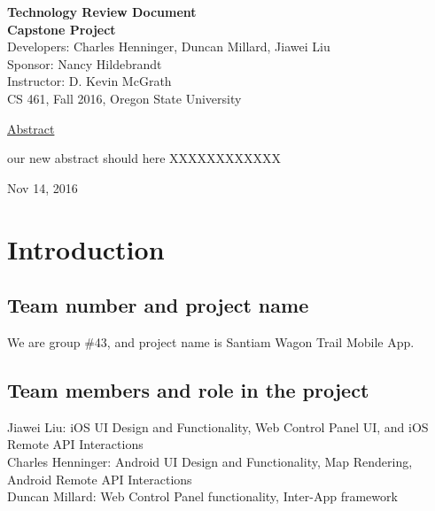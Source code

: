 \documentclass[letterpaper, 10pt,titlepage]{article}
\newcommand\tab[1][1cm]{\hspace*{#1}}
\begin{document}
\begin{titlepage}
\begin{center}
    \Huge
    \textbf{Technology Review Document}\\
    \textbf{Capstone Project}\\
    \vspace{1.0cm}
    \large
    Developers: Charles Henninger, Duncan Millard, Jiawei Liu\\
    Sponsor: Nancy Hildebrandt\\
    \vspace{1.5cm}
    \large
    Instructor: D. Kevin McGrath\\

    \large
    CS 461, Fall 2016, Oregon State University\\    

    \vspace{3.2cm}

    \large
    \underline{Abstract}\\
    \vspace{0.3cm}
    \end{center}
    \large

    \tab our new abstract should here XXXXXXXXXXXX
    
    \vspace{0.8cm}
    \vfill
    
\begin{center}    
    Nov 14, 2016

\end{center}
\end{titlepage}


\tableofcontents
\newpage



\section{Introduction}
\subsection{Team number and project name}
We are group \#43, and project name is Santiam Wagon Trail Mobile App.


\subsection{Team members and role in the project}
Jiawei Liu: iOS UI Design and Functionality, Web Control Panel UI, and iOS Remote API Interactions \\
Charles Henninger: Android UI Design and Functionality, Map Rendering, Android Remote API Interactions\\
Duncan Millard: Web Control Panel functionality, Inter-App framework
\end{document}
